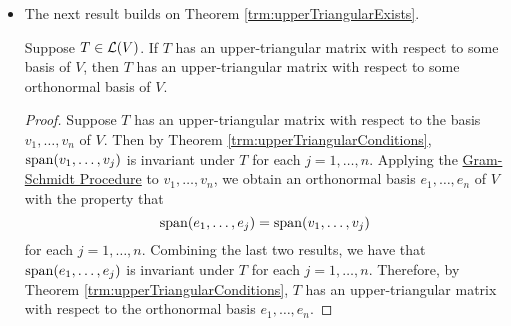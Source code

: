 \documentclass[../main.tex]{subfiles}
\begin{document}
\begin{itemize}
\begin{theorem}
        Suppose $V$ is finite-dimensional. Then every orthonormal list of vectors in $V$ can be extended to an orthonormal basis of $V$.
        \begin{proof}
            Suppose $e_1,\dots,e_m$ is an orthonormal list of vectors in $V$. Then by Theorem \ref{trm:orthonormalLnlIndep}, $e_1,\dots,e_m$ is linearly independent. Hence this list can be extended to a basis $e_1,\dots,e_m,v_1,\dots,v_n$ of $V$ by Theorem \ref{trm:lnlIndependentExtendBasis}. Applying the \hyperref[trm:GramSchmidt]{Gram-Schmidt Procedure} to this basis yields an orthonormal list $e_1,\dots,e_m,f_1,\dots,f_n$ of vectors in $V$. Note that the \hyperref[trm:GramSchmidt]{Gram-Schmidt Procedure} doesn't change the first $m$ vectors of the list: If $1\leq j\leq m$, then
            \begin{align*}
                e_j' &= \frac{e_j-\inp{e_j}{e_1}e_1-\cdots-\inp{e_j}{e_{j-1}}e_{j-1}}{\norm{e_j-\inp{e_j}{e_1}e_1-\cdots-\inp{e_j}{e_{j-1}}e_{j-1}}}\\
                &= \frac{e_j}{\norm{e_j}}\\
                &= e_j
            \end{align*}
            Lastly, by Theorem \ref{trm:dimOrthonormal}, we know that $e_1,\dots,e_m,f_1,\dots,f_n$ is a basis of $V$.
        \end{proof}
    \end{theorem}
    \item The next result builds on Theorem \ref{trm:upperTriangularExists}.
    \begin{theorem}\label{trm:upperTriangularOrthonormal}
        Suppose $T\in\mathcal{L}(V)$. If $T$ has an upper-triangular matrix with respect to some basis of $V$, then $T$ has an upper-triangular matrix with respect to some orthonormal basis of $V$.
        \begin{proof}
            Suppose $T$ has an upper-triangular matrix with respect to the basis $v_1,\dots,v_n$ of $V$. Then by Theorem \ref{trm:upperTriangularConditions}, $\operatorname{span}(v_1,\dots,v_j)$ is invariant under $T$ for each $j=1,\dots,n$. Applying the \hyperref[trm:GramSchmidt]{Gram-Schmidt Procedure} to $v_1,\dots,v_n$, we obtain an orthonormal basis $e_1,\dots,e_n$ of $V$ with the property that
            \begin{equation*}
                \operatorname{span}(e_1,\dots,e_j) = \operatorname{span}(v_1,\dots,v_j)
            \end{equation*}
            for each $j=1,\dots,n$. Combining the last two results, we have that $\operatorname{span}(e_1,\dots,e_j)$ is invariant under $T$ for each $j=1,\dots,n$. Therefore, by Theorem \ref{trm:upperTriangularConditions}, $T$ has an upper-triangular matrix with respect to the orthonormal basis $e_1,\dots,e_n$.

\end{proof}
\end{theorem}
\end{itemize}
\end{document}
